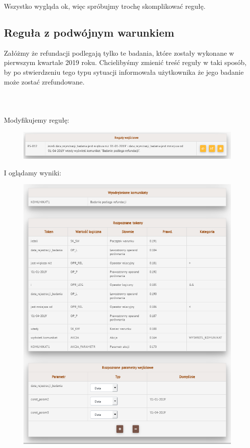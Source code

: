 Wszystko wygląda ok, więc spróbujmy trochę skomplikować regułę. 

\subsection{Reguła z podwójnym warunkiem}
Załóżmy że refundacji podlegają tylko te badania, które zostały wykonane w pierwszym kwartale 2019 roku. Chcielibyśmy zmienić treść reguły w taki sposób, by po stwierdzeniu tego typu sytuacji informowała użytkownika że jego badanie może zostać zrefundowane.
\\ \\
\\ \\
Modyfikujemy regułę:
\begin{figure}[H]
	\centering
	\includegraphics[scale=0.8]{img/app-eksperymenty/p2-1.png}
\end{figure}
I oglądamy wyniki:
\begin{figure}[H]
	\centering
	\includegraphics[scale=0.8]{img/app-eksperymenty/p2-2.png}
\end{figure}
